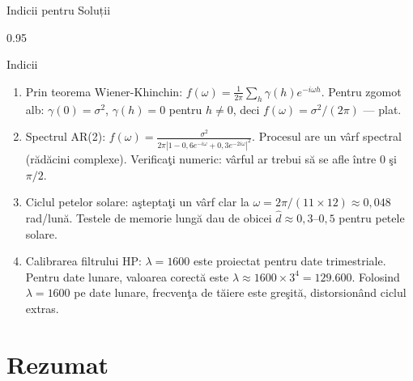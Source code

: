 \documentclass[9pt, aspectratio=169, t]{beamer}
\begin{document}
\begin{frame}{Indicii pentru Soluții}
    \begin{cminipage}{0.95\textwidth}
    \vspace{-0.3cm}
    {\footnotesize
    \begin{block}{Indicii}
        \begin{enumerate}\setlength{\itemsep}{1pt}
            \item Prin teorema Wiener-Khinchin: $f(\omega) = \frac{1}{2\pi}\sum_{h}\gamma(h)e^{-i\omega h}$. Pentru zgomot alb: $\gamma(0)=\sigma^2$, $\gamma(h)=0$ pentru $h\neq 0$, deci $f(\omega) = \sigma^2/(2\pi)$ --- plat.

            \item Spectrul AR(2): $f(\omega) = \frac{\sigma^2}{2\pi|1 - 0{,}6e^{-i\omega} + 0{,}3e^{-2i\omega}|^2}$. Procesul are un vârf spectral (rădăcini complexe). Verificaţi numeric: vârful ar trebui să se afle între 0 şi $\pi/2$.

            \item Ciclul petelor solare: aşteptaţi un vârf clar la $\omega = 2\pi/(11 \times 12) \approx 0{,}048$ rad/lună. Testele de memorie lungă dau de obicei $\hat{d} \approx 0{,}3$--$0{,}5$ pentru petele solare.

            \item Calibrarea filtrului HP: $\lambda = 1600$ este proiectat pentru date trimestriale. Pentru date lunare, valoarea corectă este $\lambda \approx 1600 \times 3^4 = 129{.}600$. Folosind $\lambda=1600$ pe date lunare, frecvenţa de tăiere este greşită, distorsionând ciclul extras.
        \end{enumerate}
    \end{block}
    }
    \end{cminipage}
\end{frame}

\section{Rezumat}
\end{document}
